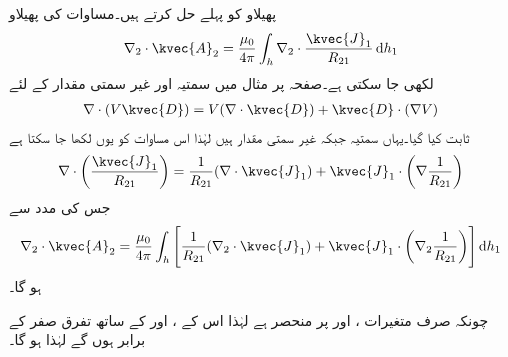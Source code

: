 پھیلاو کو پہلے حل کرتے ہیں۔مساوات  کی پھیلاو
\begin{align}
\nabla_2 \cdot \kvec{A}_2=\frac{\mu_0}{4\pi}\int_h \nabla_2 \cdot \frac{\kvec{J}_1}{R_{21}} \dif h_1
\end{align}
لکھی جا سکتی ہے۔صفحہ  پر مثال  میں سمتیہ  اور غیر سمتی مقدار  کے لئے
\begin{align*}
\nabla \cdot  (V \kvec{D})=V (\nabla \cdot \kvec{D})+\kvec{D} \cdot (\nabla V)
\end{align*}
ثابت کیا گیا۔یہاں سمتیہ  جبکہ غیر سمتی مقدار  ہیں لہٰذا اس مساوات کو یوں لکھا جا سکتا ہے
\begin{align}\label{مساوات_مقناطیسی_سمتیہ_اور_غیر_سمتی_کے_حاصل_ضرب_کی_گردش_ب}
\nabla \cdot  \left(\frac{ \kvec{J}_1}{R_{21}}\right)=\frac{1}{R_{21}} (\nabla \cdot \kvec{J}_1)+\kvec{J}_1 \cdot \left(\nabla \frac{1}{R_{21}}\right)
\end{align}
 جس کی مدد سے
\begin{align}
\nabla_2 \cdot \kvec{A}_2=\frac{\mu_0}{4\pi}\int_h \left[\frac{1}{R_{21}} (\nabla_2 \cdot \kvec{J}_1)+\kvec{J}_1 \cdot \left(\nabla_2 \frac{1}{R_{21}}\right)\right] \dif h_1
\end{align}
ہو گا۔

چونکہ  صرف متغیرات ،  اور  پر منحصر ہے لہٰذا اس کے ،  اور  کے ساتھ تفرق صفر کے برابر ہوں گے لہٰذا  ہو گا۔

